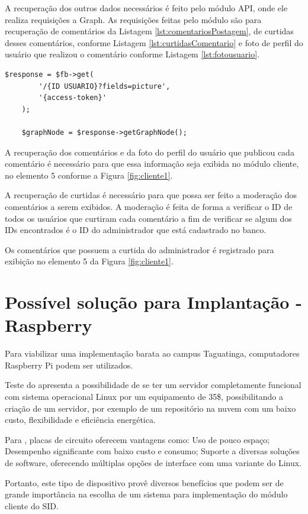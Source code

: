 A recuperação dos outros dados necessários é feito pelo módulo API, onde ele realiza requisições a Graph. As requisições feitas pelo módulo são para recuperação de comentários da Listagem \ref{lst:comentariosPostagem}, de curtidas desses comentários, conforme Listagem \ref{lst:curtidasComentario} e foto de perfil do usuário que realizou o comentário conforme Listagem \ref{lst:fotousuario}.

\begin{lstlisting}[caption={Foto de usuário},label={lst:fotousuario}]
  	$response = $fb->get(
    	'/{ID USUARIO}?fields=picture',
		'{access-token}'
	);
	
	$graphNode = $response->getGraphNode();
\end{lstlisting}

A recuperação dos comentários e da foto do perfil do usuário que publicou cada comentário é necessário para que essa informação seja exibida no módulo cliente, no elemento 5 conforme a Figura \ref{fig:cliente1}.

A recuperação de curtidas é necessário para que possa ser feito a moderação dos comentários a serem exibidos. A moderação é feita de forma a verificar o ID de todos os usuários que curtiram cada comentário a fim de verificar se algum dos IDs encontrados é o ID do administrador que está cadastrado no banco.

Os comentários que possuem a curtida do administrador é registrado para exibição no elemento 5 da Figura \ref{fig:cliente1}.

\section{Possível solução para Implantação - Raspberry}
Para viabilizar uma implementação barata ao campus Taguatinga, computadores Raspberry Pi podem ser utilizados.

Teste do \cite{aristotelous2016} apresenta a possibilidade de se ter um servidor completamente funcional com sistema operacional Linux por um equipamento de 35\$, possibilitando a criação de um servidor, por exemplo de um repositório na nuvem com um baixo custo, flexibilidade e eficiência energética. 

Para \cite{cusick2014}, placas de circuito oferecem vantagens como: Uso de pouco espaço; Desempenho significante com baixo custo e consumo; Suporte a diversas soluções de software, oferecendo múltiplas opções de interface com uma variante do Linux. 

Portanto, este tipo de dispositivo provê diversos benefícios que podem ser de grande importância na escolha de um sistema para implementação do módulo cliente do SID.